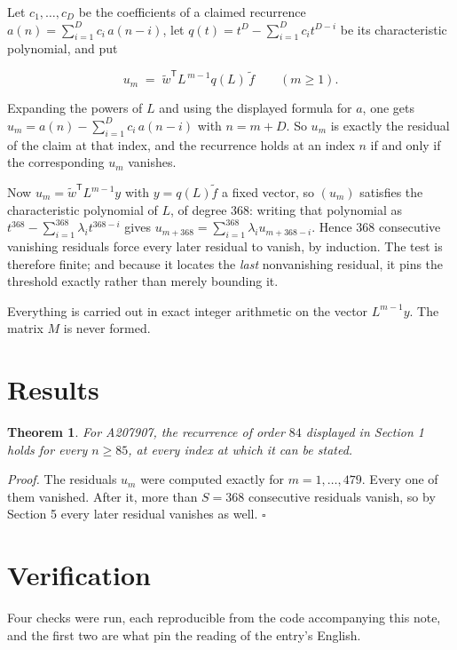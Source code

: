 \documentclass[11pt]{article}
\newtheorem{theorem}{Theorem}
\theoremstyle{definition}
\begin{document}
Let $c_1,\dots,c_D$ be the coefficients of a claimed recurrence $a(n) = \sum_{i=1}^{D} c_i\,a(n-i)$, let $q(t) = t^{D} - \sum_{i=1}^{D} c_i t^{D-i}$ be its characteristic polynomial, and put

\[u_m \;=\; \tilde w^{\mathsf T} L^{\,m-1} q(L)\,\tilde f \qquad (m \ge 1).\]

Expanding the powers of $L$ and using the displayed formula for $a$, one gets $u_m = a(n) - \sum_{i=1}^{D} c_i\,a(n-i)$ with $n = m + D$. So $u_m$ is exactly the residual of the claim at that index, and the recurrence holds at an index $n$ if and only if the corresponding $u_m$ vanishes.

Now $u_m = \tilde w^{\mathsf T} L^{m-1} y$ with $y = q(L)\tilde f$ a fixed vector, so $(u_m)$ satisfies the characteristic polynomial of $L$, of degree $368$: writing that polynomial as $t^{368} - \sum_{i=1}^{368} \lambda_i t^{368-i}$ gives $u_{m+368} = \sum_{i=1}^{368} \lambda_i u_{m+368-i}$. Hence $368$ consecutive vanishing residuals force every later residual to vanish, by induction. The test is therefore finite; and because it locates the {\itshape last} nonvanishing residual, it pins the threshold exactly rather than merely bounding it.

Everything is carried out in exact integer arithmetic on the vector $L^{m-1}y$. The matrix $M$ is never formed.

\section{Results}

\begin{theorem} For A207907, the recurrence of order $84$ displayed in Section 1 holds for every $n \ge 85$, at every index at which it can be stated.\end{theorem}

{\itshape Proof.} The residuals $u_m$ were computed exactly for $m = 1,\dots,479$. Every one of them vanished. After it, more than $S = 368$ consecutive residuals vanish, so by Section 5 every later residual vanishes as well. $\square$

\section{Verification}

Four checks were run, each reproducible from the code accompanying this note, and the first two are what pin the reading of the entry's English.
\end{document}
